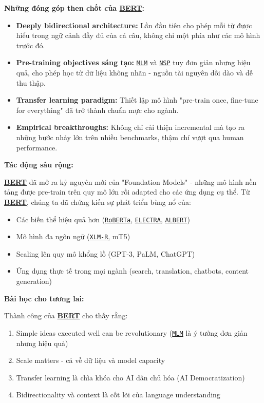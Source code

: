\textbf{Những đóng góp then chốt của \hyperref[acro:bert]{\textbf{BERT}}:}
\begin{itemize}
    \item \textbf{Deeply bidirectional architecture:} Lần đầu tiên cho phép mỗi từ được hiểu trong ngữ cảnh đầy đủ của cả câu, không chỉ một phía như các mô hình trước đó.
    \item \textbf{Pre-training objectives sáng tạo:} \hyperref[acro:mlm]{\texttt{MLM}} và \hyperref[acro:nsp]{\texttt{NSP}} tuy đơn giản nhưng hiệu quả, cho phép học từ dữ liệu không nhãn - nguồn tài nguyên dồi dào và dễ thu thập.
    \item \textbf{Transfer learning paradigm:} Thiết lập mô hình "pre-train once, fine-tune for everything" đã trở thành chuẩn mực cho ngành.
    \item \textbf{Empirical breakthroughs:} Không chỉ cải thiện incremental mà tạo ra những bước nhảy lớn trên nhiều benchmarks, thậm chí vượt qua human performance.
\end{itemize}

\textbf{Tác động sâu rộng:}

\hyperref[acro:bert]{\textbf{BERT}} đã mở ra kỷ nguyên mới của "Foundation Models" - những mô hình nền tảng được pre-train trên quy mô lớn rồi adapted cho các ứng dụng cụ thể.
Từ \hyperref[acro:bert]{\textbf{BERT}}, chúng ta đã chứng kiến sự phát triển bùng nổ của:
\begin{itemize}
    \item Các biến thể hiệu quả hơn (\hyperref[acro:roberta]{\texttt{RoBERTa}}, \hyperref[acro:electra]{\texttt{ELECTRA}}, \hyperref[acro:albert]{\texttt{ALBERT}})
    \item Mô hình đa ngôn ngữ (\hyperref[acro:xlm-r]{\texttt{XLM-R}}, mT5)
    \item Scaling lên quy mô khổng lồ (GPT-3, PaLM, ChatGPT)
    \item Ứng dụng thực tế trong mọi ngành (search, translation, chatbots, content generation)
\end{itemize}

\textbf{Bài học cho tương lai:}

Thành công của \hyperref[acro:bert]{\textbf{BERT}} cho thấy rằng:
\begin{enumerate}
    \item Simple ideas executed well can be revolutionary (\hyperref[acro:mlm]{\texttt{MLM}} là ý tưởng đơn giản nhưng hiệu quả)
    \item Scale matters - cả về dữ liệu và model capacity
    \item Transfer learning là chìa khóa cho AI dân chủ hóa (AI Democratization)
    \item Bidirectionality và context là cốt lõi của language understanding
\end{enumerate}


